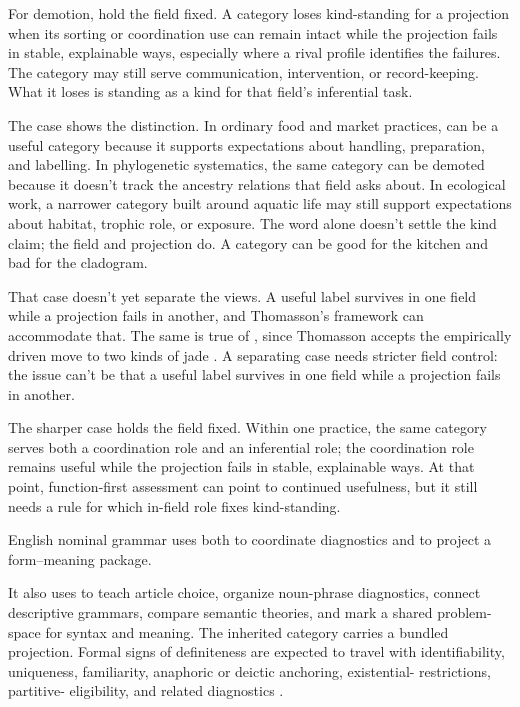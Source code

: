 \documentclass[12pt]{article}
\begin{document}
For demotion, hold the field fixed. A category loses kind-standing for a projection when its sorting or coordination use can remain intact while the projection fails in stable, explainable ways, especially where a rival profile identifies the failures. The category may still serve communication, intervention, or record-keeping. What it loses is standing as a kind for that field's inferential task.

The  case shows the distinction. In ordinary food and market practices,  can be a useful category because it supports expectations about handling, preparation, and labelling. In phylogenetic systematics, the same category can be demoted because it doesn't track the ancestry relations that field asks about. In ecological work, a narrower category built around aquatic life may still support expectations about habitat, trophic role, or exposure. The word alone doesn't settle the kind claim; the field and projection do. A category can be good for the kitchen and bad for the cladogram.

That case doesn't yet separate the views. A useful label survives in one field while a projection fails in another, and Thomasson's framework can accommodate that. The same is true of , since Thomasson accepts the empirically driven move to two kinds of jade \citep[101--102]{thomasson2020norms}. A separating case needs stricter field control: the issue can't be that a useful label survives in one field while a projection fails in another.

The sharper case holds the field fixed. Within one practice, the same category serves both a coordination role and an inferential role; the coordination role remains useful while the projection fails in stable, explainable ways. At that point, function-first assessment can point to continued usefulness, but it still needs a rule for which in-field role fixes kind-standing.

English nominal grammar uses  both to coordinate diagnostics and to project a form--meaning package.

It also uses  to teach article choice, organize noun-phrase diagnostics, connect descriptive grammars, compare semantic theories, and mark a shared problem-space for syntax and meaning. The inherited category carries a bundled projection. Formal signs of definiteness are expected to travel with identifiability, uniqueness, familiarity, anaphoric or deictic anchoring, existential- restrictions, partitive- eligibility, and related diagnostics \citep{lyons1999,reynolds2025definiteness}.
\end{document}
